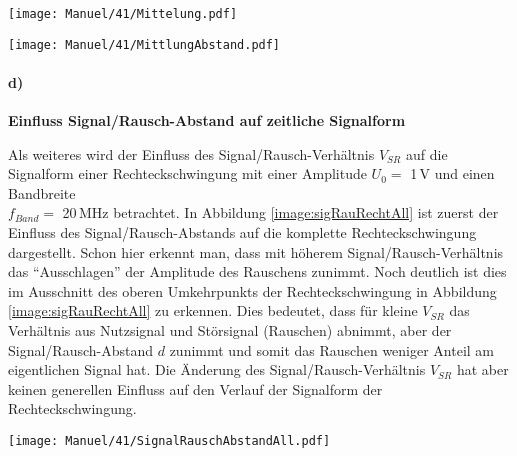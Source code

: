 \newpage
\begin{center}
    \texttt{[image: Manuel/41/Mittelung.pdf]}
    \label{image:einflussMittelung}
\end{center}
\begin{center}
    \texttt{[image: Manuel/41/MittlungAbstand.pdf]}
    \label{image:abstandMittelung}
\end{center}

\newpage
\paragraph{d)}\textbf{Einfluss Signal/Rausch-Abstand auf zeitliche Signalform}

Als weiteres wird der Einfluss des Signal/Rausch-Verhältnis $V_{SR}$ auf die Signalform einer Rechteckschwingung mit einer Amplitude $U_0=$ 1\,V und einen Bandbreite\\$f_{Band}=$ 20\,MHz betrachtet.
In Abbildung \ref{image:sigRauRechtAll} ist zuerst der Einfluss des Signal/Rausch-Abstands auf die komplette Rechteckschwingung dargestellt. Schon hier erkennt man, dass mit höherem Signal/Rausch-Verhältnis das \enquote{Ausschlagen} der Amplitude des Rauschens zunimmt. Noch deutlich ist dies im Ausschnitt des oberen Umkehrpunkts der Rechteckschwingung in Abbildung \ref{image:sigRauRechtAll} zu erkennen. Dies bedeutet, dass für kleine $V_{SR}$ das Verhältnis aus Nutzsignal und Störsignal (Rauschen) abnimmt, aber der Signal/Rausch-Abstand $d$ zunimmt und somit das Rauschen weniger Anteil am eigentlichen Signal hat. Die Änderung des Signal/Rausch-Verhältnis $V_{SR}$ hat aber keinen generellen Einfluss auf den Verlauf der Signalform der Rechteckschwingung. 
\begin{center}
    \texttt{[image: Manuel/41/SignalRauschAbstandAll.pdf]}
    \label{image:sigRauRechtAll}
\end{center}
\newpage


